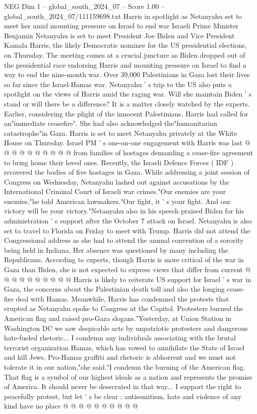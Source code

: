 \begin{textsample}{NEG Dim 1 – global\_south\_2024\_07 – Score 1.00 – global\_south\_2024\_07/111159698.txt}  \label{ex:f1_neg_277}
Harris in spotlight as Netanyahu set to meet her amid mounting pressure on Israel to end war Israeli Prime Minister Benjamin Netanyahu is set to meet President Joe Biden and Vice President Kamala Harris, the likely Democratic nominee for the US presidential elections, on Thursday.
The meeting comes at a crucial juncture as Biden dropped out of the presidential race endorsing Harris and mounting pressure on Israel to find a way to end the nine-month war.
Over 39,000 Palestinians in Gaza lost their lives so far since the Israel-Hamas war.
Netanyahu ' s trip to the US also puts a spotlight on the views of Harris amid the raging war.
Will she maintain Biden ' s stand or will there be a difference?
It is a matter closely watched by the experts.
Earlier, considering the plight of the innocent Palestinians, Harris had called for an"immediate ceasefire".
She had also acknowledged the"humanitarian catastrophe"in Gaza.
Harris is set to meet Netanyahu privately at the White House on Thursday.
Israel PM ' s one-on-one engagement with Harris was last @ @ @ @ @ @ @ @ @ @ from families of hostages demanding a cease-fire agreement to bring home their loved ones.
Recently, the Israeli Defence Forces ( IDF ) recovered the bodies of five hostages in Gaza.
While addressing a joint session of Congress on Wednesday, Netanyahu lashed out against accusations by the International Criminal Court of Israeli war crimes."Our enemies are your enemies,"he told American lawmakers."Our fight, it ' s your fight.
And our victory will be your victory."Netanyahu also in his speech praised Biden for his administration ' s support after the October 7 attack on Israel.
Netanyahu is also set to travel to Florida on Friday to meet with Trump.
Harris did not attend the Congressional address as she had to attend the annual convention of a sorority being held in Indiana.
Her absence was questioned by many including the Republicans.
According to experts, though Harris is more critical of the war in Gaza than Biden, she is not expected to express views that differ from current @ @ @ @ @ @ @ @ @ @ Harris is likely to reiterate US support for Israel ' s war in Gaza, the concerns about the Palestinian death toll and also the longing cease-fire deal with Hamas.
Meanwhile, Harris has condemned the protests that erupted as Netanyahu spoke to Congress at the Capitol.
Protesters burned the American flag and raised pro-Gaza slogans."Yesterday, at Union Station in Washington DC we saw despicable acts by unpatriotic protesters and dangerous hate-fueled rhetoric...
I condemn any individuals associating with the brutal terrorist organization Hamas, which has vowed to annihilate the State of Israel and kill Jews.
Pro-Hamas graffiti and rhetoric is abhorrent and we must not tolerate it in our nation,"she said."I condemn the burning of the American flag.
That flag is a symbol of our highest ideals as a nation and represents the promise of America.
It should never be desecrated in that way...
I support the right to peacefully protest, but let ' s be clear : antisemitism, hate and violence of any kind have no place @ @ @ @ @ @ @ @ @ @

\end{textsample}

